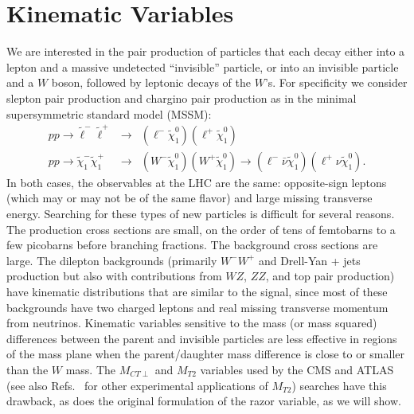 
\section{Kinematic Variables \label{sec:variables}}

We are interested in the pair production of particles that each decay either into a lepton and a massive undetected ``invisible'' particle, or into an invisible particle and a $W$ boson, followed by leptonic decays of the $W$'s. For specificity we consider slepton pair production and chargino pair production
as in the minimal supersymmetric standard model (MSSM):
\begin{eqnarray}
p p \to \tilde{\ell}^-\tilde{\ell}^+ & \to & (\ell^- \tilde{\chi}^0_1)(\ell^+ \tilde{\chi}^0_1)  \\
p p \to \tilde{\chi}_1^-\tilde{\chi}_1^+ & \to & (W^-\tilde{\chi}_1^0)(W^+\tilde{\chi}_1^0) \to (\ell^-\bar{\nu}\tilde{\chi}_1^0)(\ell^+\nu\tilde{\chi}_1^0).
\end{eqnarray}
In both cases, the observables at the LHC are the same: opposite-sign leptons (which may or may not be of the same flavor) and large missing transverse energy. Searching for these types of new particles is difficult for several reasons. The production cross sections are small, on the order of tens of femtobarns to a few picobarns before branching fractions. The background cross sections are large. The dilepton backgrounds (primarily $W^-W^+$ and Drell-Yan + jets production but also with contributions from $WZ$, $ZZ$, and top pair production) have kinematic distributions that
are similar to the signal, since most of these backgrounds have two charged leptons and real missing transverse momentum from neutrinos. Kinematic variables sensitive to the mass (or mass squared) differences between the parent and invisible particles are less effective in regions of the mass plane when the parent/daughter mass difference is close to or smaller than the $W$ mass. The $M_{CT\perp}$ \cite{Matchev:2009ad,Tovey:2008ui} and $M_{T2}$ \cite{Lester:1999tx,Barr:2003rg} variables  used by the CMS \cite{CMS-PAS-SUS-13-006} and ATLAS \cite{ATLAS-CONF-2013-049} (see also Refs.~\cite{Chatrchyan:2012jx,Aaltonen:2009rm} for other experimental applications of $M_{T2}$) searches have this drawback, as does the original formulation of the razor variable, as we will show.

